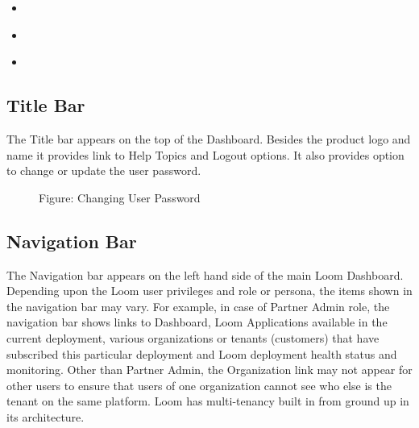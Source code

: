 \documentclass[letterpaper,10pt,english]{sphinxmanual}
\begin{document}
\begin{sphinxShadowBox}
\begin{itemize}
\item {} 
\label{\detokenize{loom_getting_started_guide:id78}}{\hyperref[\detokenize{loom_getting_started_guide:title-bar}]{}}

\item {} 
\label{\detokenize{loom_getting_started_guide:id79}}{\hyperref[\detokenize{loom_getting_started_guide:navigation-bar}]{}}

\item {} 
\label{\detokenize{loom_getting_started_guide:id80}}{\hyperref[\detokenize{loom_getting_started_guide:main-display}]{}}

\end{itemize}
\end{sphinxShadowBox}


\subsection{Title Bar}
\label{\detokenize{loom_getting_started_guide:title-bar}}
The Title bar appears on the top of the Dashboard.  Besides the product logo and name it provides link to Help Topics and Logout options. It also provides option to change or update the user password.

\begin{figure}[htbp]
\centering
\capstart

\noindent{}
\caption{Figure: Changing User Password}\label{\detokenize{loom_getting_started_guide:id16}}\end{figure}


\subsection{Navigation Bar}
\label{\detokenize{loom_getting_started_guide:navigation-bar}}
The Navigation bar appears on the left hand side of the main Loom Dashboard. Depending upon the Loom user privileges and role or persona, the items shown in the navigation bar may vary.  For example, in case of Partner Admin role, the navigation bar shows links to Dashboard, Loom Applications available in the current deployment, various organizations or tenants (customers) that have subscribed this particular deployment and Loom deployment health status and monitoring.  Other than Partner Admin, the Organization link may not appear for other users to ensure that users of one organization cannot see who else is the tenant on the same platform.  Loom has multi-tenancy built in from ground up in its architecture.
\end{document}
